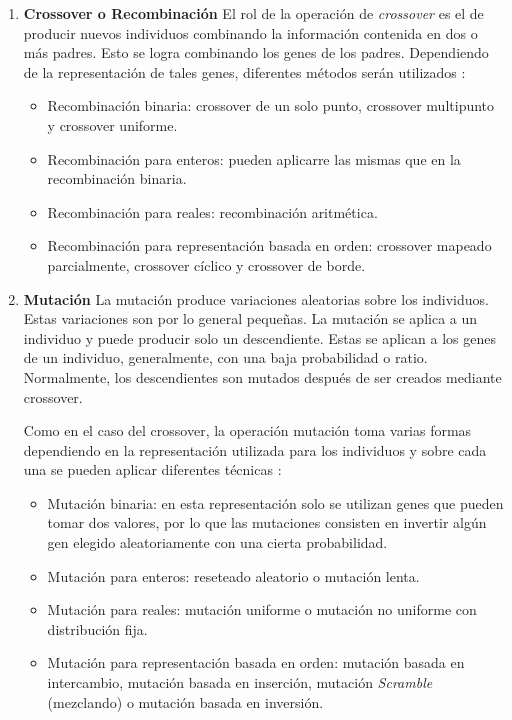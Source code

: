 \begin{enumerate}
        \item{\bf Crossover o Recombinación}
El rol de la operación de \emph{crossover} es el de producir nuevos individuos combinando la información contenida en dos o más padres. Esto se logra combinando los genes de los padres. Dependiendo de la  representación de  tales genes, diferentes métodos serán utilizados \cite{grosan2011intelligent}: 

\begin{itemize}
    \item Recombinación binaria: crossover de un solo punto, crossover multipunto y crossover uniforme.
    \item Recombinación para enteros: pueden aplicarre las mismas que en la recombinación binaria.
    \item Recombinación para reales: recombinación aritmética.
    \item Recombinación para representación basada en orden:  crossover mapeado parcialmente, crossover cíclico y crossover de borde.
\end{itemize}

\item{\bf Mutación}
La mutación produce variaciones aleatorias sobre los individuos. Estas variaciones son por lo general pequeñas. La mutación se aplica a un individuo y puede producir solo un descendiente. Estas se aplican a los genes de un individuo, generalmente, con una baja probabilidad o ratio. Normalmente, los descendientes son mutados después de ser creados mediante crossover.

Como en el caso del crossover, la operación mutación toma varias formas dependiendo en la representación utilizada para los individuos y sobre cada una se pueden aplicar diferentes técnicas \cite{grosan2011intelligent}:

\begin{itemize}
    \item Mutación binaria: en esta representación solo se utilizan genes que pueden tomar dos valores, por lo que las mutaciones consisten en invertir algún gen elegido aleatoriamente con una cierta probabilidad.
    \item Mutación para enteros: reseteado aleatorio o mutación lenta.
    \item Mutación para reales: mutación uniforme o mutación no uniforme con distribución fija.
    \item Mutación para representación basada en orden: mutación basada en intercambio, mutación basada en inserción, mutación \emph{Scramble} (mezclando) o mutación basada en inversión.
\end{itemize}
\end{enumerate}
    

